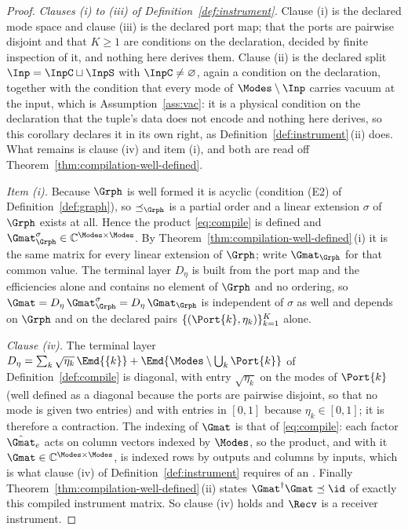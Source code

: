 \begin{proof}
\emph{Clauses (i) to (iii) of Definition~\ref{def:instrument}.} Clause (i) is
the declared mode space and clause (iii) is the declared port map; that the
ports are pairwise disjoint and that $K\ge1$ are conditions on the
declaration, decided by finite inspection of it, and nothing here derives
them. Clause (ii) is the declared split $\Inp=\InpC\sqcup\InpS$ with
$\InpC\neq\varnothing$, again a condition on the declaration, together with
the condition that every mode of $\Modes\setminus\Inp$ carries vacuum at the
input, which is Assumption~\ref{ass:vac}: it is a physical condition on the
declaration that the tuple's data does not encode and nothing here derives,
so this corollary declares it in its own right, as
Definition~\ref{def:instrument}\,(ii) does. What remains is clause (iv) and
item (i), and both are read off Theorem~\ref{thm:compilation-well-defined}.

\emph{Item (i).} Because $\Grph$ is well formed it is acyclic (condition (E2)
of Definition~\ref{def:graph}), so $\preceq_\Grph$
is a partial order and a linear extension $\sigma$ of $\Grph$ exists at all.
Hence the product \eqref{eq:compile} is defined and
$\Gmat^\sigma_\Grph\in\mathbb{C}^{\Modes\times\Modes}$. By
Theorem~\ref{thm:compilation-well-defined}\,(i) it is the same matrix for every linear extension of
$\Grph$; write $\Gmat_\Grph$ for that common value. The terminal layer
$D_\eta$ is built from the port map and the efficiencies alone and contains no
element of $\Grph$ and no ordering, so $\Gmat=D_\eta\,\Gmat^\sigma_\Grph=
D_\eta\,\Gmat_\Grph$ is independent of $\sigma$ as well and depends on $\Grph$
and on the declared pairs $\{(\Port{k},\eta_k)\}_{k=1}^{K}$ alone.

\emph{Clause (iv).} The terminal layer $D_\eta=\sum_k\sqrt{\eta_k}\,\Emd{\{k\}}+
\Emd{\Modes\setminus\bigcup_k\Port{k}}$ of Definition~\ref{def:compile} is
diagonal, with entry $\sqrt{\eta_k}$ on the modes of $\Port{k}$ (well
defined as a diagonal because the ports are pairwise disjoint, so that no mode
is given two entries) and with entries in $[0,1]$ because
$\eta_k\in[0,1]$; it is therefore a contraction. The indexing of $\Gmat$ is
that of \eqref{eq:compile}: each factor $\hat\Gmat_e$ acts on column vectors
indexed by $\Modes$, so the product, and with it
$\Gmat\in\mathbb{C}^{\Modes\times\Modes}$, is indexed rows by outputs and
columns by inputs, which is what clause (iv) of
Definition~\ref{def:instrument} requires of an .
Finally Theorem~\ref{thm:compilation-well-defined}\,(ii) states $\Gmat^\dagger\Gmat\preceq\id$ of
exactly this compiled instrument matrix. So clause (iv) holds and $\Recv$ is a
receiver instrument.
\end{proof}
